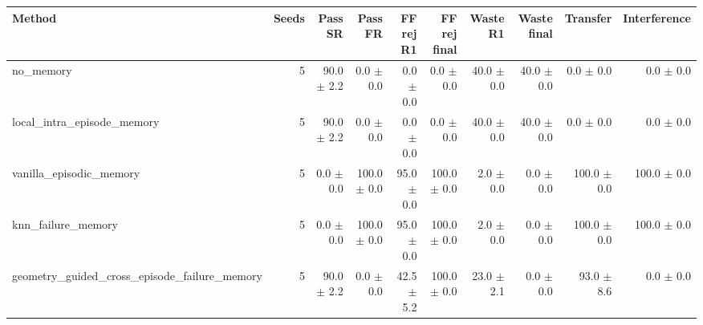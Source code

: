 \begin{tabular}{lrrrrrrrrr}
\toprule
Method & Seeds & Pass SR & Pass FR & FF rej R1 & FF rej final & Waste R1 & Waste final & Transfer & Interference \\
\midrule
no\_memory & 5 & 90.0 $\pm$ 2.2 & 0.0 $\pm$ 0.0 & 0.0 $\pm$ 0.0 & 0.0 $\pm$ 0.0 & 40.0 $\pm$ 0.0 & 40.0 $\pm$ 0.0 & 0.0 $\pm$ 0.0 & 0.0 $\pm$ 0.0 \\
local\_intra\_episode\_memory & 5 & 90.0 $\pm$ 2.2 & 0.0 $\pm$ 0.0 & 0.0 $\pm$ 0.0 & 0.0 $\pm$ 0.0 & 40.0 $\pm$ 0.0 & 40.0 $\pm$ 0.0 & 0.0 $\pm$ 0.0 & 0.0 $\pm$ 0.0 \\
vanilla\_episodic\_memory & 5 & 0.0 $\pm$ 0.0 & 100.0 $\pm$ 0.0 & 95.0 $\pm$ 0.0 & 100.0 $\pm$ 0.0 & 2.0 $\pm$ 0.0 & 0.0 $\pm$ 0.0 & 100.0 $\pm$ 0.0 & 100.0 $\pm$ 0.0 \\
knn\_failure\_memory & 5 & 0.0 $\pm$ 0.0 & 100.0 $\pm$ 0.0 & 95.0 $\pm$ 0.0 & 100.0 $\pm$ 0.0 & 2.0 $\pm$ 0.0 & 0.0 $\pm$ 0.0 & 100.0 $\pm$ 0.0 & 100.0 $\pm$ 0.0 \\
geometry\_guided\_cross\_episode\_failure\_memory & 5 & 90.0 $\pm$ 2.2 & 0.0 $\pm$ 0.0 & 42.5 $\pm$ 5.2 & 100.0 $\pm$ 0.0 & 23.0 $\pm$ 2.1 & 0.0 $\pm$ 0.0 & 93.0 $\pm$ 8.6 & 0.0 $\pm$ 0.0 \\
\bottomrule
\end{tabular}
